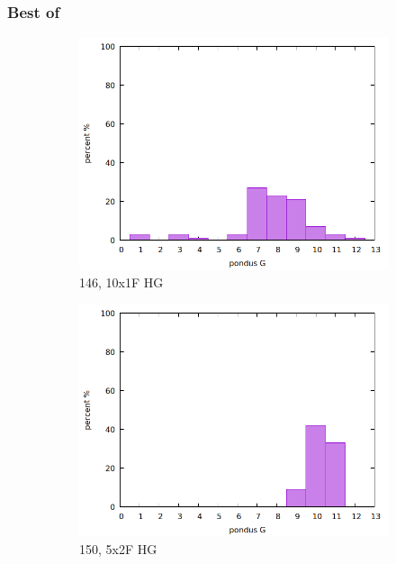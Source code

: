 \documentclass{beamer}
\begin{document}
\begin{frame}
	\frametitle[center]{Best of}
		\begin{figure}
			\begin{subfigure}{.32\textwidth}
				\includegraphics[width=.99\textwidth]{../../Data/I-V/I-V_146_2021-02-23/stat.png}
				\caption{146, 10x1F HG}
			\end{subfigure}
			\begin{subfigure}{.32\textwidth}
				\includegraphics[width=.99\textwidth]{../../Data/I-V/I-V_150_2021_02_09/stat.png}
				\caption{150, 5x2F HG}
			\end{subfigure}
			\begin{subfigure}{.32\textwidth}

\end{subfigure}
\end{figure}
\end{frame}
\end{document}
